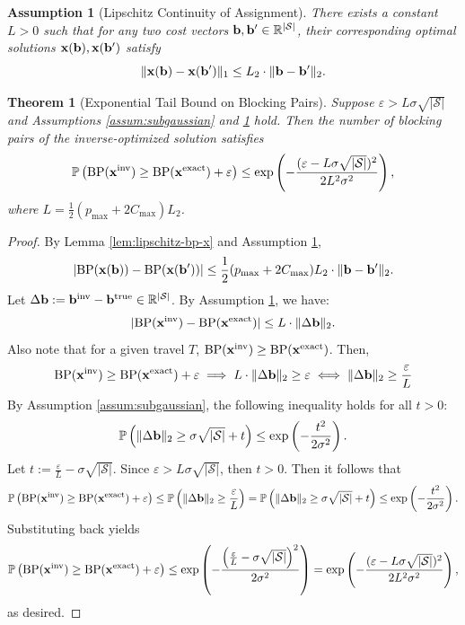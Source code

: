 \documentclass[11pt]{article}
\newtheorem{theorem}{Theorem}
\newtheorem{assumption}{Assumption}
\begin{document}
\begin{assumption}[Lipschitz Continuity of Assignment]\label{assum:lipschitz}
There exists a constant \( L > 0 \) such that for any two cost vectors \( {\bf b}, {\bf b}' \in \mathbb{R}^{|\mathcal{S}|} \), their corresponding optimal solutions \( {\bf x}({\bf b}), {\bf x}({\bf b}') \) satisfy
\[
\|{\bf x}({\bf b}) - {\bf x}({\bf b}')\|_1 \leq L_2 \cdot \|{\bf b} - {\bf b}'\|_2.
\]
\end{assumption}


\begin{theorem}[Exponential Tail Bound on Blocking Pairs] \label{thm:bp_tailbound}
Suppose \( \varepsilon > L \sigma \sqrt{|\mathcal{S}|} \) and Assumptions \ref{assum:subgaussian} and \ref{assum:lipschitz} hold. 
Then the number of blocking pairs of the inverse-optimized solution satisfies
\[
\mathbb{P}\left( \textnormal{BP}({\bf x}^{\textnormal{inv}}) \geq \textnormal{BP}({\bf x}^{\textnormal{exact}}) + \varepsilon \right)
\leq \exp\left( -\frac{(\varepsilon - L \sigma \sqrt{|\mathcal{S}|})^2}{2 L^2 \sigma^2} \right), 
\]
where $ L = \frac{1}{2}(p_{\max} + 2C_{\max}) L_2$.
\end{theorem}

\begin{proof}
By Lemma \ref{lem:lipschitz-bp-x} and Assumption \ref{assum:lipschitz}, 
\[
|\text{BP}({\bf x}({\bf b})) - \text{BP}({\bf x}({\bf b}'))| \leq \frac{1}{2}(p_{\max} + 2C_{\max}) L_2 \cdot \|{\bf b} - {\bf b}'\|_2.
\]
Let \( \Delta {\bf b} := {\bf b}^{\text{inv}} - {\bf b}^{\text{true}} \in \mathbb{R}^{|\mathcal{S}|} \).
By Assumption \ref{assum:lipschitz}, we have:
\[
| \text{BP}({\bf x}^{\text{inv}}) - \text{BP}({\bf x}^{\text{exact}}) | \leq L \cdot \| \Delta {\bf b} \|_2.
\]
Also note that for a given travel $T$, \(\text{BP}({\bf x}^{\text{inv}}) \geq \text{BP}({\bf x}^{\text{exact}}) \). Then, 
\[
\text{BP}({\bf x}^{\text{inv}}) \geq \text{BP}({\bf x}^{\text{exact}}) + \varepsilon
\implies
L \cdot \| \Delta {\bf b} \|_2 \geq \varepsilon 
\iff  \| \Delta {\bf b} \|_2 \geq  \frac{\varepsilon }{L}
\]
By Assumption \ref{assum:subgaussian}, the following inequality holds for all $t >0$:
\[
\mathbb{P}\left( \| \Delta {\bf b} \|_2 \geq \sigma \sqrt{|\mathcal{S}|} + t \right)
\leq \exp\left( -\frac{t^2}{2\sigma^2} \right). 
\]
Let \( t := \frac{\varepsilon}{L} - \sigma \sqrt{|\mathcal{S}|} \). Since \( \varepsilon > L \sigma \sqrt{|\mathcal{S}|} \), then \( t > 0 \). Then it follows that 
\[
\mathbb{P}\left( \text{BP}({\bf x}^{\text{inv}}) \geq \text{BP}({\bf x}^{\text{exact}}) + \varepsilon \right)
\leq \mathbb{P}\left( \| \Delta {\bf b} \|_2 \geq \frac{\varepsilon}{L} \right)
= \mathbb{P}\left( \| \Delta {\bf b} \|_2 \geq \sigma \sqrt{|\mathcal{S}|} + t \right)
\leq \exp\left( -\frac{t^2}{2\sigma^2} \right).
\]
Substituting back yields
\[
\mathbb{P}\left( \text{BP}({\bf x}^{\text{inv}}) \geq \text{BP}({\bf x}^{\text{exact}}) + \varepsilon \right)
\leq
\exp\left( -\frac{\left( \frac{\varepsilon}{L} - \sigma \sqrt{|\mathcal{S}|} \right)^2}{2 \sigma^2} \right)
= \exp\left( -\frac{(\varepsilon - L \sigma \sqrt{|\mathcal{S}|})^2}{2 L^2 \sigma^2} \right),
\]
as desired.
\end{proof}
\end{document}
